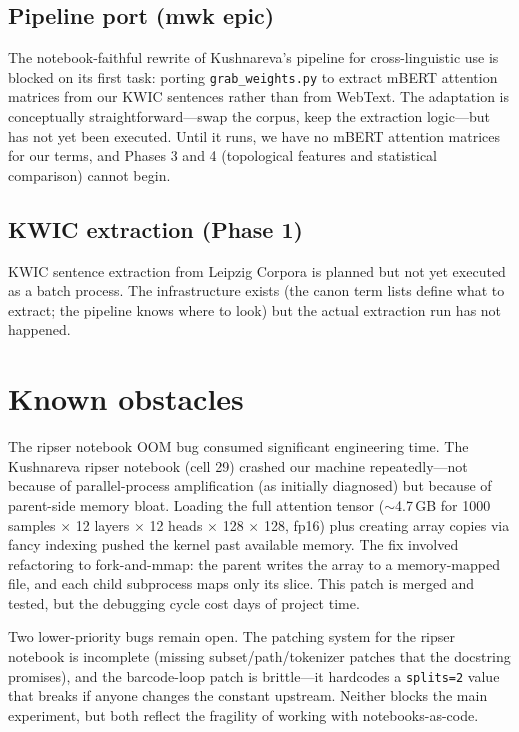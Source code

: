 \subsection{Pipeline port (mwk epic)}

The notebook-faithful rewrite of Kushnareva's pipeline for cross-linguistic use is blocked on its first task: porting \texttt{grab\_weights.py} to extract mBERT attention matrices from our KWIC sentences rather than from WebText. The adaptation is conceptually straightforward---swap the corpus, keep the extraction logic---but has not yet been executed. Until it runs, we have no mBERT attention matrices for our terms, and Phases 3 and 4 (topological features and statistical comparison) cannot begin.

\subsection{KWIC extraction (Phase 1)}

KWIC sentence extraction from Leipzig Corpora is planned but not yet executed as a batch process. The infrastructure exists (the canon term lists define what to extract; the pipeline knows where to look) but the actual extraction run has not happened.

\section{Known obstacles}

The ripser notebook OOM bug consumed significant engineering time. The Kushnareva ripser notebook (cell 29) crashed our machine repeatedly---not because of parallel-process amplification (as initially diagnosed) but because of parent-side memory bloat. Loading the full attention tensor ($\sim$4.7\,GB for 1000 samples $\times$ 12 layers $\times$ 12 heads $\times$ 128 $\times$ 128, fp16) plus creating array copies via fancy indexing pushed the kernel past available memory. The fix involved refactoring to fork-and-mmap: the parent writes the array to a memory-mapped file, and each child subprocess maps only its slice. This patch is merged and tested, but the debugging cycle cost days of project time.

Two lower-priority bugs remain open. The patching system for the ripser notebook is incomplete (missing subset/path/tokenizer patches that the docstring promises), and the barcode-loop patch is brittle---it hardcodes a \texttt{splits=2} value that breaks if anyone changes the constant upstream. Neither blocks the main experiment, but both reflect the fragility of working with notebooks-as-code.

